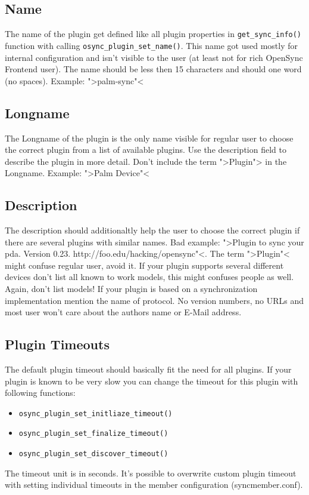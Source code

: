 \subsection{Name}
The name of the plugin get defined like all plugin properties in
\verb|get_sync_info()| function with calling \verb|osync_plugin_set_name()|.
This name got used mostly for internal configuration and isn't visible to the 
user (at least not for rich OpenSync Frontend user). The name should be less
then 15 characters and should one word (no spaces). Example: ">palm-sync"<
\subsection{Longname}
The Longname of the plugin is the only name visible for  regular user to choose 
the correct plugin from a list of available plugins. Use the description field
to describe the plugin in more detail. Don't include the term ">Plugin"> in the
Longname. Example: ">Palm Device"<
\subsection{Description}
The description should additionaltly help the user to choose the correct plugin
if there are several plugins with similar names. Bad example: ">Plugin to sync 
your pda. Version 0.23. http://foo.edu/hacking/opensync"<. The term ">Plugin"< 
might confuse regular user, avoid it. If your plugin supports several different
devices don't list all known to work models, this might confuses people as well.
Again, don't list models! If your plugin is based on a synchronization 
implementation mention the name of protocol. No version numbers, no URLs and 
most user won't care about the authors name or E-Mail address.
\subsection{Plugin Timeouts}
The default plugin timeout should basically fit the need for all plugins. If
your plugin is known to be very slow you can change the timeout for this plugin
with following functions:
\begin{itemize}
\item \verb|osync_plugin_set_initliaze_timeout()|
\item \verb|osync_plugin_set_finalize_timeout()|
\item \verb|osync_plugin_set_discover_timeout()|
\end{itemize}
The timeout unit is in seconds. It's possible to overwrite custom plugin timeout
with setting individual timeouts in the member configuration (syncmember.conf).
